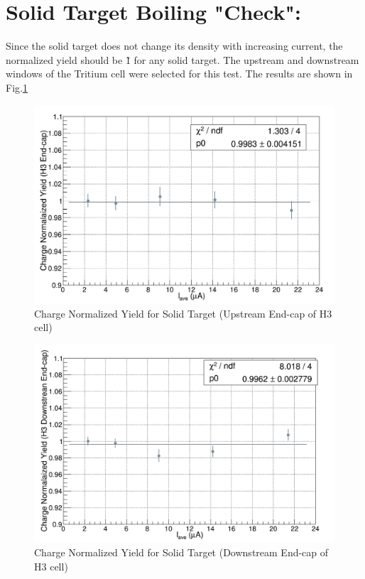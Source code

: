 \documentclass[11pt]{article}
\begin{document}
\section{Solid Target Boiling "Check":}
Since the solid target does not change its density with increasing current, the normalized yield should be \~ 1 for any solid target. The upstream and downstream windows of the Tritium cell were selected for this test. The results are shown in Fig.\ref{fig:upstream}
\begin{figure}[H]
  \includegraphics[width=\linewidth]{upstream.png}
  \caption{Charge Normalized Yield for Solid Target (Upstream End-cap of H3 cell)}
  \label{fig:upstream}
\end{figure}
\begin{figure}[H]
  \includegraphics[width=\linewidth]{downstream.png}
  \caption{Charge Normalized Yield for Solid Target (Downstream End-cap of H3 cell)}
  \label{fig:downstream}
\end{figure}
\end{document}
